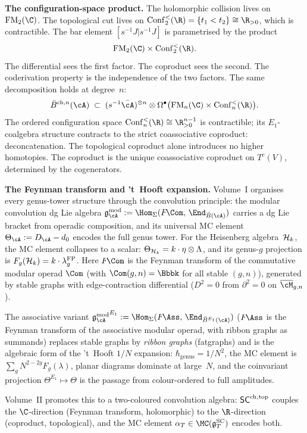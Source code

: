 \medskip
\noindent\textbf{The configuration-space product.}\enspace
The holomorphic collision lives on $\FM_2(\C)$. The topological
cut lives on $\Conf_2^<(\R) = \{t_1 < t_2\} \cong \R_{>0}$,
which is contractible. The bar element
$[s^{-1}J | s^{-1}J]$ is parametrised by the product
\[
\FM_2(\C) \times \Conf_2^<(\R).
\]
The differential sees the first factor. The coproduct sees the
second. The coderivation property is the independence of the two
factors. The same decomposition holds at degree~$n$:
\[
\bar{B}^{\mathrm{ch},n}(\cA)
\;\subset\;
(s^{-1}\bar\cA)^{\otimes n}
\otimes
\Omega^\bullet\bigl(\FM_n(\C) \times \Conf_n^<(\R)\bigr).
\]
The ordered configuration space $\Conf_n^<(\R) \cong
\R^{n-1}_{> 0}$ is contractible; its $E_1$-coalgebra structure
contracts to the strict coassociative coproduct: deconcatenation.
The topological coproduct alone introduces no higher homotopies. The
coproduct is the unique
coassociative coproduct on $T^c(V)$, determined by the
cogenerators.


\medskip\noindent\textbf{The Feynman transform and 't~Hooft expansion.}\enspace
Volume~I organises every genus-tower structure through the
convolution principle: the modular convolution dg Lie algebra
$\gAmod := \Hom_\Sigma(F\!\Com,\, \End_{\barB(\cA)})$
carries a dg Lie bracket from operadic composition, and
its universal MC element
$\Theta_\cA := D_\cA - d_0$ encodes the full genus tower.
For the Heisenberg algebra~$\mathcal{H}_k$, the MC element collapses to a
scalar: $\Theta_{\mathcal{H}_k} = k \cdot \eta \otimes \Lambda$, and its
genus-$g$ projection is
$F_g(\mathcal{H}_k) = k \cdot \lambda_g^{\mathrm{FP}}$.
Here $F\!\Com$ is the Feynman transform of the commutative
modular operad $\Com$ (with $\Com(g,n) = \Bbbk$ for all stable $(g,n)$), generated by stable graphs with edge-contraction
differential ($D^2 = 0$ from $\partial^2 = 0$ on
$\overline{\cM}_{g,n}$).

The associative variant
${\gAmod}^{E_1} := \Hom_\Sigma(F\!\Ass,\,
\End_{\barB^{E_1}(\cA)})$
($F\!\Ass$ is the Feynman transform of the associative modular operad, with ribbon graphs as summands)
replaces stable graphs by \emph{ribbon graphs} (fatgraphs)
and is the algebraic form of the 't~Hooft $1/N$ expansion:
$\hbar_{\mathrm{genus}} = 1/N^2$, the MC element is
$\sum_g N^{2-2g}F_g(\lambda)$, planar diagrams dominate at
large~$N$, and the coinvariant projection
$\Theta^{E_1} \mapsto \Theta$ is the passage from
colour-ordered to full amplitudes.

Volume~II promotes this to a two-coloured convolution algebra: $\mathsf{SC}^{\mathrm{ch,top}}$ couples the $\C$-direction (Feynman transform, holomorphic) to the $\R$-direction (coproduct, topological), and the MC element $\alpha_T \in \MC(\gSC_T)$ encodes both.

